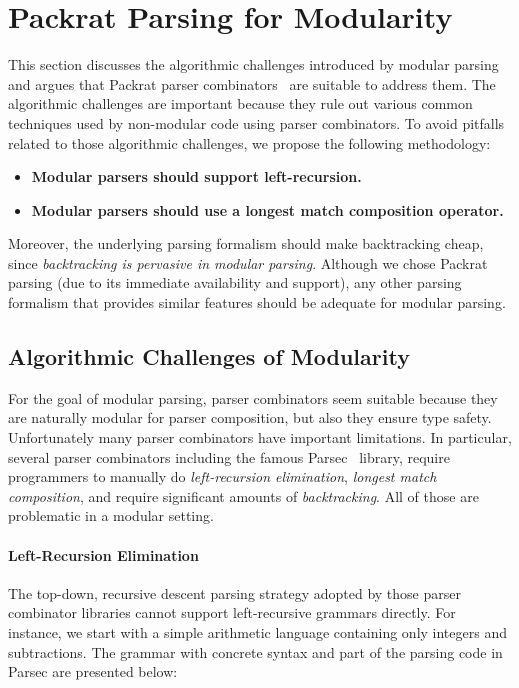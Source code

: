 \section{Packrat Parsing for Modularity}\label{sec:packrat}

This section discusses the algorithmic challenges introduced by
modular parsing and argues that Packrat parser combinators~\cite{Ford2002}
are suitable to address them. The algorithmic challenges
are important because they rule out various common techniques
used by non-modular code using parser combinators.
To avoid pitfalls related to those algorithmic challenges,
we propose the following methodology:

\begin{itemize}[leftmargin=*]

\item \textbf{Modular parsers should support left-recursion.}

\item \textbf{Modular parsers should use a longest match composition operator.}

\end{itemize}

Moreover, the underlying parsing formalism should make backtracking
cheap, since \emph{backtracking is pervasive in modular parsing}.
Although we chose Packrat parsing (due to its immediate availability
and support), any other parsing formalism that provides similar
features should be adequate for modular parsing.

\subsection{Algorithmic Challenges of Modularity}\label{subsec:challenges}
For the goal of modular parsing, parser combinators seem suitable because they are
naturally modular for parser composition, but also they ensure type safety.
Unfortunately many parser combinators have important limitations.
In particular, several parser combinators including the famous Parsec~\cite{Leijen2001} library, require
programmers to manually do \textit{left-recursion elimination}, \textit{longest match composition}, and
require significant amounts of \textit{backtracking}. All of those are
problematic in a modular setting.

\paragraph{Left-Recursion Elimination} The top-down, recursive descent parsing strategy adopted by those parser combinator libraries cannot support left-recursive grammars directly. For instance, we start with a simple arithmetic language containing only integers and subtractions. The
grammar with concrete syntax and part of the parsing code in Parsec are presented below:

